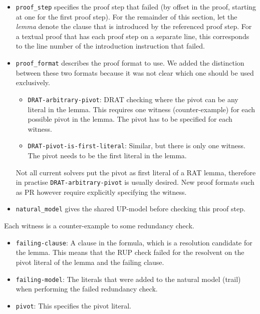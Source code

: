 \documentclass[
]{report}
\providecommand{\tightlist}{%
  \setlength{\itemsep}{0pt}\setlength{\parskip}{0pt}}
\begin{document}
\begin{itemize}
\item
  \texttt{proof\_step} specifies the proof step that failed (by offset
  in the proof, starting at one for the first proof step). For the
  remainder of this section, let the \emph{lemma} denote the clause that
  is introduced by the referenced proof step. For a textual proof that
  has each proof step on a separate line, this corresponds to the line
  number of the introduction instruction that failed.
\item
  \texttt{proof\_format} describes the proof format to use. We added the
  distinction between these two formats because it was not clear which
  one should be used exclusively.

  \begin{itemize}
  \tightlist
  \item
    \texttt{DRAT-arbitrary-pivot}: DRAT checking where the pivot can be
    any literal in the lemma. This requires one witness
    (counter-example) for each possible pivot in the lemma. The pivot
    has to be specified for each witness.
  \item
    \texttt{DRAT-pivot-is-first-literal}: Similar, but there is only one
    witness. The pivot needs to be the first literal in the lemma.
  \end{itemize}

  Not all current solvers put the pivot as first literal of a RAT lemma,
  therefore in practise \texttt{DRAT-arbitrary-pivot} is usually
  desired. New proof formats such as PR however require explicitly
  specifying the witness.
\item
  \texttt{natural\_model} gives the shared UP-model before checking this
  proof step.
\end{itemize}

Each witness is a counter-example to some redundancy check.

\begin{itemize}
\tightlist
\item
  \texttt{failing-clause}: A clause in the formula, which is a
  resolution candidate for the lemma. This means that the RUP check
  failed for the resolvent on the pivot literal of the lemma and the
  failing clause.
\item
  \texttt{failing-model}: The literals that were added to the natural
  model (trail) when performing the failed redundancy check.
\item
  \texttt{pivot}: This specifies the pivot literal.
\end{itemize}
\end{document}
